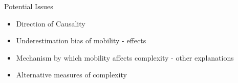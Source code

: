 \documentclass{beamer}
\begin{document}
\begin{frame}{Potential Issues}{}
\begin{itemize}
\item{Direction of Causality}
\item{Underestimation bias of mobility - effects}
\item{Mechanism by which mobility affects complexity - other explanations}
\item{Alternative measures of complexity }
\end{itemize}
\end{frame}





\end{document}
